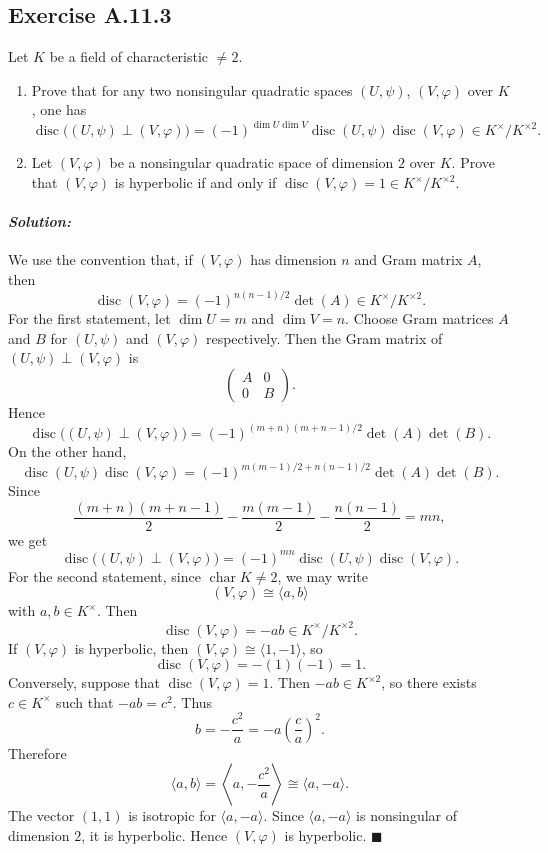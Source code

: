 \documentclass[12pt, a4paper]{article}
\newenvironment{solution}
  {\paragraph{\textit{Solution:}}\par\medskip}
  {\hfill$\blacksquare$\vspace{0.1cm}}
\begin{document}
\subsection*{Exercise A.11.3}

Let $K$ be a field of characteristic $\neq 2$.

\begin{enumerate}
    \item Prove that for any two nonsingular quadratic spaces $(U,\psi)$, $(V,\varphi)$ over $K$, one has
    \[
        \operatorname{disc}\bigl((U,\psi)\perp (V,\varphi)\bigr)
        =
        (-1)^{\dim U \dim V}
        \operatorname{disc}(U,\psi)\operatorname{disc}(V,\varphi)
        \in K^{\times}/K^{\times 2}.
    \]

    \item Let $(V,\varphi)$ be a nonsingular quadratic space of dimension $2$ over $K$. Prove that $(V,\varphi)$ is hyperbolic if and only if $\operatorname{disc}(V,\varphi)=1\in K^{\times}/K^{\times 2}$.
\end{enumerate}

\begin{solution}
    We use the convention that, if $(V,\varphi)$ has dimension $n$ and Gram matrix $A$, then \[ \operatorname{disc}(V,\varphi) = (-1)^{n(n-1)/2}\det(A) \in K^\times/K^{\times 2}. \] For the first statement, let $\dim U=m$ and $\dim V=n$. Choose Gram matrices $A$ and $B$ for $(U,\psi)$ and $(V,\varphi)$ respectively. Then the Gram matrix of $(U,\psi)\perp (V,\varphi)$ is \[ \begin{pmatrix} A & 0\\ 0 & B \end{pmatrix}. \] Hence \[ \operatorname{disc}\bigl((U,\psi)\perp (V,\varphi)\bigr) = (-1)^{(m+n)(m+n-1)/2}\det(A)\det(B). \] On the other hand, \[ \operatorname{disc}(U,\psi)\operatorname{disc}(V,\varphi) = (-1)^{m(m-1)/2+n(n-1)/2}\det(A)\det(B). \] Since \[ \frac{(m+n)(m+n-1)}{2} - \frac{m(m-1)}{2} - \frac{n(n-1)}{2} = mn, \] we get \[ \operatorname{disc}\bigl((U,\psi)\perp (V,\varphi)\bigr) = (-1)^{mn} \operatorname{disc}(U,\psi)\operatorname{disc}(V,\varphi). \] For the second statement, since $\operatorname{char}K\neq 2$, we may write \[ (V,\varphi)\cong \langle a,b\rangle \] with $a,b\in K^\times$. Then \[ \operatorname{disc}(V,\varphi)=-ab\in K^\times/K^{\times 2}. \] If $(V,\varphi)$ is hyperbolic, then $(V,\varphi)\cong \langle 1,-1\rangle$, so \[ \operatorname{disc}(V,\varphi)=-(1)(-1)=1. \] Conversely, suppose that $\operatorname{disc}(V,\varphi)=1$. Then $-ab\in K^{\times 2}$, so there exists $c\in K^\times$ such that $-ab=c^2$. Thus \[ b=-\frac{c^2}{a}=-a\left(\frac{c}{a}\right)^2. \] Therefore \[ \langle a,b\rangle = \left\langle a,-\frac{c^2}{a}\right\rangle \cong \langle a,-a\rangle. \] The vector $(1,1)$ is isotropic for $\langle a,-a\rangle$. Since $\langle a,-a\rangle$ is nonsingular of dimension $2$, it is hyperbolic. Hence $(V,\varphi)$ is hyperbolic.
\end{solution}
\end{document}
